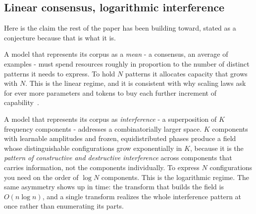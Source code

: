 \paperFramingScaling

\subsection{Linear consensus, logarithmic interference}

Here is the claim the rest of the paper has been building toward, stated as a conjecture because that is what it is.

A model that represents its corpus as a \textit{mean} - a consensus, an average of examples - must spend resources roughly in proportion to the number of distinct patterns it needs to express. To hold $N$ patterns it allocates capacity that grows with $N$. This is the linear regime, and it is consistent with why scaling laws ask for ever more parameters and tokens to buy each further increment of capability~\cite{kaplan2020}.

A model that represents its corpus as \textit{interference} - a superposition of $K$ frequency components - addresses a combinatorially larger space. $K$ components with learnable amplitudes and frozen, equidistributed phases produce a field whose distinguishable configurations grow exponentially in $K$, because it is the \textit{pattern of constructive and destructive interference} across components that carries information, not the components individually. To express $N$ configurations you need on the order of $\log N$ components. This is the logarithmic regime. The same asymmetry shows up in time: the transform that builds the field is $O(n \log n)$, and a single transform realizes the whole interference pattern at once rather than enumerating its parts.

\paperFramingInterference

